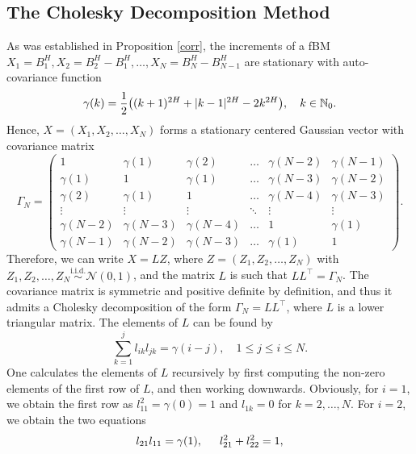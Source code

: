 \subsection{The Cholesky Decomposition Method}
As was established in Proposition \ref{corr}, the increments of a fBM $X_{1}=B_{1}^{H},X_{2}=B_{2}^{H}-B_{1}^{H}, \dots, X_{N}=B_{N}^{H}-B_{N-1}^{H}$ are stationary with auto-covariance function
\begin{equation}
    \gamma(k)=\frac{1}{2}\left((k+1)^{2H}+|k-1|^{2H}-2k^{2H}\right), \quad k\in\N_{0}.
\end{equation}
Hence, $X=(X_{1}, X_{2},\dots,X_{N})$ forms a stationary centered Gaussian vector with covariance matrix
\begin{equation}
    \Gamma_{N}=\begin{pmatrix}
        1 & \gamma(1) & \gamma(2) & \dots & \gamma(N-2) & \gamma(N-1)\\
        \gamma(1) & 1 & \gamma(1) & \dots & \gamma(N-3) &  \gamma(N-2)\\
        \gamma(2) & \gamma(1) & 1 & \dots & \gamma(N-4) & \gamma(N-3)\\
        \vdots & \vdots & \vdots & \ddots & \vdots & \vdots\\
        \gamma(N-2) & \gamma(N-3) & \gamma(N-4) & \dots & 1 & \gamma(1)\\
        \gamma(N-1) & \gamma(N-2) & \gamma(N-3) & \dots & \gamma(1) & 1
    \end{pmatrix}.
\end{equation}
Therefore, we can write $X=LZ$, where $Z=(Z_{1},Z_{2},\dots, Z_{N})$ with $Z_{1},Z_{2},\dots, Z_{N}\overset{\textrm{i.i.d.}}{\sim} \mathcal{N}(0,1)$, and the matrix $L$ is such that $LL^{\top}=\Gamma_{N}$. The covariance matrix is symmetric and positive definite by definition, and thus it admits a Cholesky decomposition of the form $\Gamma_{N}=LL^{\top}$, where $L$ is a lower triangular matrix. The elements of $L$ can be found by 
\begin{equation}
    \sum_{k=1}^{j}l_{ik}l_{jk}=\gamma(i-j), \quad 1\leq j\leq i\leq N.
\end{equation}
One calculates the elements of $L$ recursively by first computing the non-zero elements of the first row of $L$, and then working downwards. Obviously, for $i=1$, we obtain the first row as $l_{11}^{2}=\gamma(0)=1$ and $l_{1k}=0$ for $k=2,\dots,N$. For $i=2$, we obtain the two equations
\begin{align*}
    l_{21}l_{11}=\gamma(1), \hspace{15 pt} l_{21}^{2}+l_{22}^{2}=1,
\end{align*}
